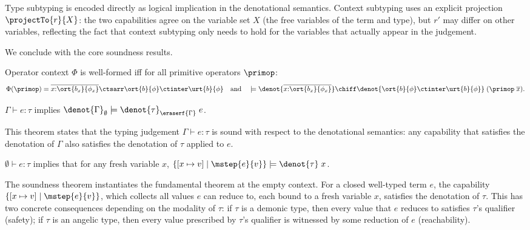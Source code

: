 Type subtyping is encoded directly as logical implication in the
denotational semantics.  Context subtyping uses an explicit projection
$\projectTo{r}{X}$: the two capabilities agree on the variable set $X$
(the free variables of the term and type), but $r'$ may differ on
other variables, reflecting the fact that context subtyping only needs
to hold for the variables that actually appear in the judgement.

We conclude with the core soundness results.

\begin{theorem}\label{thm:well-formed-operator}
  Operator context $\Phi$ is well-formed iff for all primitive
  operators $\primop$:
  {\small\begin{align*}
    \Phi(\primop) = \overline{x{:}\ort{b_x}{\phi_x}} \ctsarr \ort{b}{\phi} \ctinter \urt{b}{\phi}
    \quad\text{and}\quad
    \models \denot{\overline{x{:}\ort{b_x}{\phi_x}}} \chiff \denot{\ort{b}{\phi} \ctinter \urt{b}{\phi}}\;(\primop\;\overline{x}).
  \end{align*}}
\end{theorem}

\begin{theorem}\label{thm:fundamental}
  $\Gamma \vdash e : \tau$ implies $\denot{\Gamma}_\emptyset \models \denot{\tau}_{\eraserf{\Gamma}}\;e$.
\end{theorem}

This theorem states that the typing judgement $\Gamma \vdash e : \tau$
is sound with respect to the denotational semantics: any capability
that satisfies the denotation of $\Gamma$ also satisfies the
denotation of $\tau$ applied to $e$. 

\begin{theorem}\label{thm:soundness}
  $\emptyset \vdash e : \tau$ implies that for any fresh variable $x$,
  $\{[x \mapsto v] \mid \mstep{e}{v}\} \models \denot{\tau}\;x$.
\end{theorem}

The soundness theorem instantiates the fundamental theorem at the
empty context. For a closed well-typed term $e$, the capability $\{[x
  \mapsto v] \mid \mstep{e}{v}\}$, which collects all values $e$ can
reduce to, each bound to a fresh variable $x$, satisfies the
denotation of $\tau$. This has two concrete consequences depending on
the modality of $\tau$: if $\tau$ is a demonic type, then every
value that $e$ reduces to satisfies $\tau$'s qualifier (safety); if $\tau$
is an angelic type, then every value prescribed by $\tau$'s
qualifier is witnessed by some reduction of $e$ (reachability).
